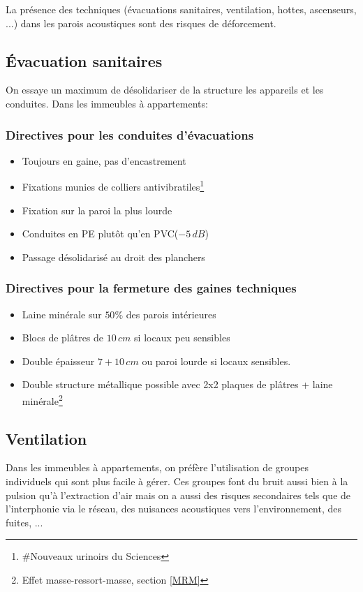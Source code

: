 \documentclass[11pt]{report}
\begin{document}
La présence des techniques (évacuations sanitaires, ventilation, hottes, ascenseurs, ...) dans les parois acoustiques sont des risques de déforcement.\\

\subsection{Évacuation sanitaires}
On essaye un maximum de désolidariser de la structure les appareils et les conduites. Dans les immeubles à appartements:

\subsubsection{Directives pour les conduites d'évacuations}
\begin{itemize}
\item Toujours en gaine, pas d'encastrement
\item Fixations munies de colliers antivibratiles\footnote{\#Nouveaux urinoirs du Sciences}
\item Fixation sur la paroi la plus lourde
\item Conduites en PE plutôt qu'en PVC($-5\,dB$)
\item Passage désolidarisé au droit des planchers
\end{itemize}

\subsubsection{Directives pour la fermeture des gaines techniques}
\begin{itemize}
\item Laine minérale sur $50\%$ des parois intérieures
\item Blocs de plâtres de $10\,cm$ si locaux peu sensibles
\item Double épaisseur $7+10\,cm$ ou paroi lourde si locaux sensibles.
\item Double structure métallique possible avec 2x2 plaques de plâtres + laine minérale\footnote{Effet masse-ressort-masse, section \ref{MRM}}
\end{itemize}



\subsection{Ventilation}
Dans les immeubles à appartements, on préfère l'utilisation de groupes individuels qui sont plus facile à gérer. Ces groupes font du bruit aussi bien à la pulsion qu'à l'extraction d'air mais on a aussi des risques secondaires tels que de l'interphonie via le réseau, des nuisances acoustiques vers l'environnement, des fuites, ...\\
\end{document}
